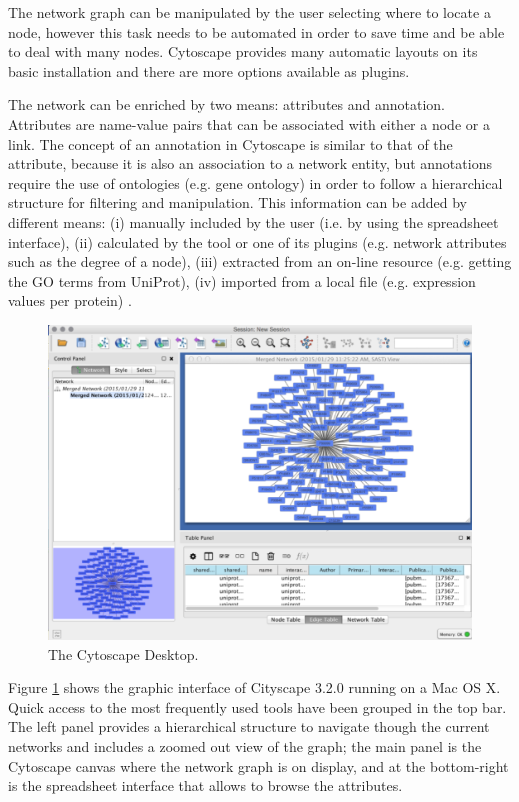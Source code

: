 The network graph can be manipulated by the user selecting where to locate a node, however this task needs to be automated in order to save time and be able to deal with many nodes. Cytoscape provides many automatic layouts on its basic installation and there are more options available as plugins.

The network can be enriched by two means: attributes and annotation. Attributes are name-value pairs that can be associated with either a node or a link. The concept of an annotation in Cytoscape is similar to that of the attribute, because it is also an association to a network entity, but annotations require the use of ontologies (e.g. gene ontology) in order to follow a hierarchical structure for filtering and manipulation.
This information can be added by different means: (i) manually included by the user (i.e. by using the spreadsheet interface), (ii) calculated by the tool or one of its plugins (e.g. network attributes such as the degree of a node), (iii) extracted from an on-line resource (e.g. getting the GO terms from UniProt), (iv) imported from a local file (e.g. expression values per protein) \cite{SAI2012}.

\begin{figure}  [t]
\centering
\includegraphics[width=\textwidth]{figures/cytoscape.png}
\caption[Cytoscape Snapshot.]{The Cytoscape Desktop.
\label{fig:cytoscape}}
\end{figure}

Figure \ref{fig:cytoscape} shows the graphic interface of Cityscape 3.2.0 running on a Mac OS X. Quick access to the most frequently used tools have been grouped in the top bar. The left panel provides a hierarchical structure to navigate though the current networks and includes a zoomed out view of the graph; the main panel is the Cytoscape canvas where the network graph is on display, and at the bottom-right is the spreadsheet interface that allows to browse the attributes.

